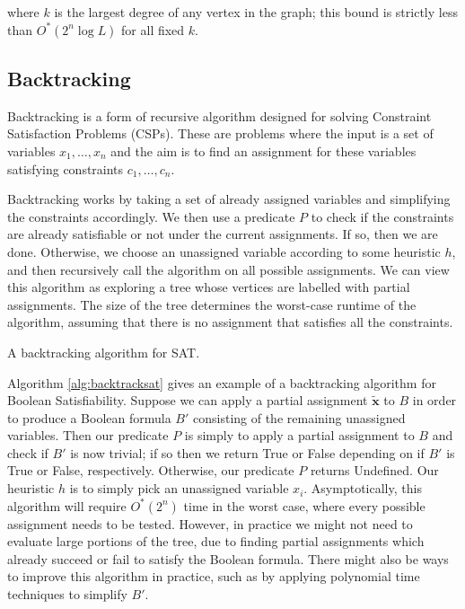 \noindent where $k$ is the largest degree of any vertex in the graph; this bound is strictly less than $O^*(2^n\log L)$ for all fixed $k$.

\subsection{Backtracking}
\label{sec:backtrack}

Backtracking is a form of recursive algorithm designed for solving Constraint Satisfaction Problems (CSPs). These are problems where the input is a set of variables $x_1,\dots,x_n$ and the aim is to find an assignment for these variables satisfying constraints $c_1,\dots,c_n$.

Backtracking works by taking a set of already assigned variables and simplifying the constraints accordingly. We then use a predicate $P$ to check if the constraints are already satisfiable or not under the current assignments. If so, then we are done. Otherwise, we choose an unassigned variable according to some heuristic $h$, and then recursively call the algorithm on all possible assignments. We can view this algorithm as exploring a tree whose vertices are labelled with partial assignments. The size of the tree determines the worst-case runtime of the algorithm, assuming that there is no assignment that satisfies all the constraints.

\begin{algorithm}
\caption{\label{alg:backtracksat} A backtracking algorithm for SAT.}
\end{algorithm}

Algorithm \ref{alg:backtracksat} gives an example of a backtracking algorithm for Boolean Satisfiability. Suppose we can apply a partial assignment $\tilde{\mathbf{x}}$ to $B$ in order to produce a Boolean formula $B'$ consisting of the remaining unassigned variables. Then our predicate $P$ is simply to apply a partial assignment to $B$ and check if $B'$ is now trivial; if so then we return True or False depending on if $B'$ is True or False, respectively. Otherwise, our predicate $P$ returns Undefined. Our heuristic $h$ is to simply pick an unassigned variable $x_i$. Asymptotically, this algorithm will require $O^*(2^n)$ time in the worst case, where every possible assignment needs to be tested. However, in practice we might not need to evaluate large portions of the tree, due to finding partial assignments which already succeed or fail to satisfy the Boolean formula. There might also be ways to improve this algorithm in practice, such as by applying polynomial time techniques to simplify $B'$.

